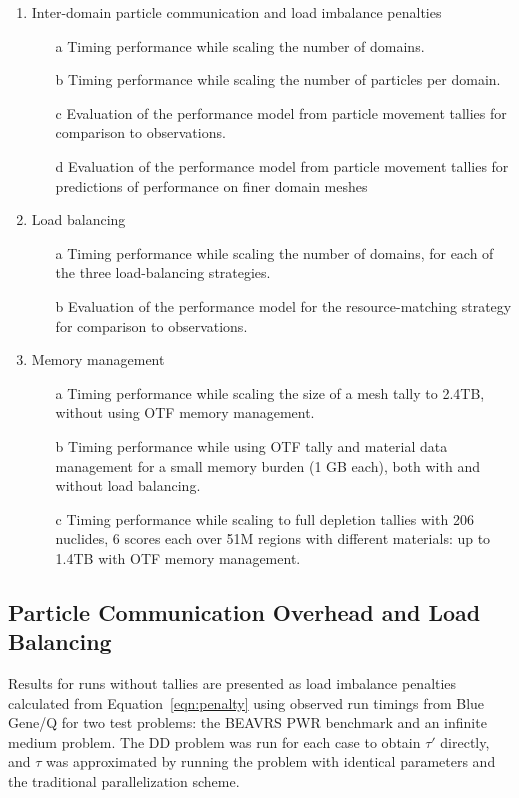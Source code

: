 \documentclass[12pt,twoside]{mitthesis-exec}
\begin{document}
\begin{enumerate}
  \item Inter-domain particle communication and load imbalance penalties
  \begin{itemize}
    \item[a] Timing performance while scaling the number of domains.
    \item[b] Timing performance while scaling the number of particles per domain.
    \item[c] Evaluation of the performance model from particle movement tallies
    for comparison to observations.
    \item[d] Evaluation of the performance model from particle movement tallies
    for predictions of performance on finer domain meshes
  \end{itemize}
  \item Load balancing
  \begin{itemize}
    \item[a] Timing performance while scaling the number of domains, for each of
    the three load-balancing strategies.
    \item[b] Evaluation of the performance model for the resource-matching
    strategy for comparison to observations.
  \end{itemize}
  \item Memory management
  \begin{itemize}
    \item[a] Timing performance while scaling the size of a mesh tally to 2.4TB,
    without using OTF memory management.
    \item[b] Timing performance while using OTF tally and material data
    management for a small memory burden (1 GB each), both with and without load
    balancing.
    \item[c] Timing performance while scaling to full depletion tallies with 206
    nuclides, 6 scores each over 51M regions with different materials: up to
    1.4TB with OTF memory management.
  \end{itemize}
\end{enumerate}

\subsection*{Particle Communication Overhead and Load Balancing}

Results for runs without tallies are presented as load imbalance penalties
calculated from Equation~\ref{eqn:penalty} using observed run timings from Blue
Gene/Q for two test problems: the BEAVRS PWR benchmark and an infinite medium
problem. The DD problem was run for each case to obtain $\tau'$ directly, and
$\tau$ was approximated by running the problem with identical parameters and the
traditional parallelization scheme.
\end{document}
